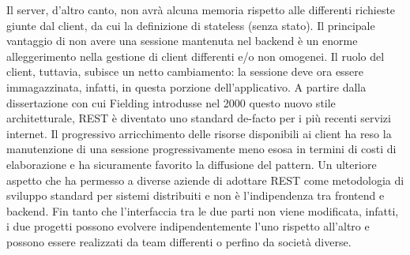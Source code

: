 Il server, d'altro canto, non avrà alcuna memoria rispetto alle differenti richieste giunte dal client, da cui la definizione di stateless (senza stato).
Il principale vantaggio di non avere una sessione mantenuta nel backend è un enorme alleggerimento nella gestione di client differenti e/o non omogenei.
Il ruolo del client, tuttavia, subisce un netto cambiamento: la sessione deve ora essere immagazzinata, infatti, in questa porzione dell'applicativo.
A partire dalla dissertazione con cui Fielding introdusse nel 2000 questo nuovo stile architetturale, REST è diventato uno standard de-facto per i più recenti servizi internet.
Il progressivo arricchimento delle risorse disponibili ai client ha reso la manutenzione di una sessione progressivamente meno esosa in termini di costi di elaborazione e ha sicuramente favorito la diffusione del pattern.
Un ulteriore aspetto che ha permesso a diverse aziende di adottare REST come metodologia di sviluppo standard per sistemi distribuiti e non è l'indipendenza tra frontend e backend.
Fin tanto che l'interfaccia tra le due parti non viene modificata, infatti, i due progetti possono evolvere indipendentemente l'uno rispetto all'altro e possono essere realizzati da team differenti o perfino da società diverse.
\\
